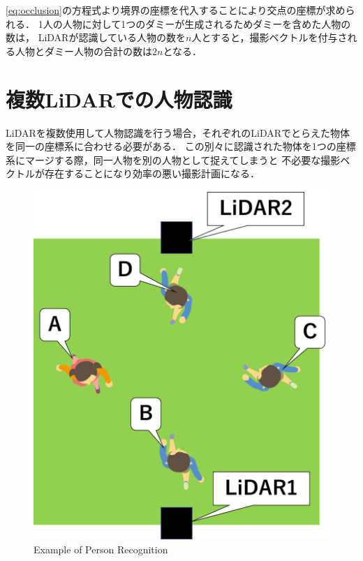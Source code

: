\documentclass[autodetect-engine,dvipdfmx-if-dvi,ja=standard,a4j,jbase=11pt,magstyle=nomag*]{bxjsreport}
\begin{document}
\cref{eq:occlusion}の方程式より境界の座標を代入することにより交点の座標が求められる．
1人の人物に対して1つのダミーが生成されるためダミーを含めた人物の数は，
LiDARが認識している人物の数を$n$人とすると，撮影ベクトルを付与される人物とダミー人物の合計の数は$2n$となる．

\newpage
\section{複数LiDARでの人物認識}
LiDARを複数使用して人物認識を行う場合，それぞれのLiDARでとらえた物体を同一の座標系に合わせる必要がある．
この別々に認識された物体を1つの座標系にマージする際，同一人物を別の人物として捉えてしまうと
不必要な撮影ベクトルが存在することになり効率の悪い撮影計画になる．

\begin{figure}[b]
    \centering
    \includegraphics[width=0.7\linewidth, clip]{./figure/chapter3/example.png}
    \caption{Example of Person Recognition}
    \label{fig:example}
\end{figure}
\end{document}

